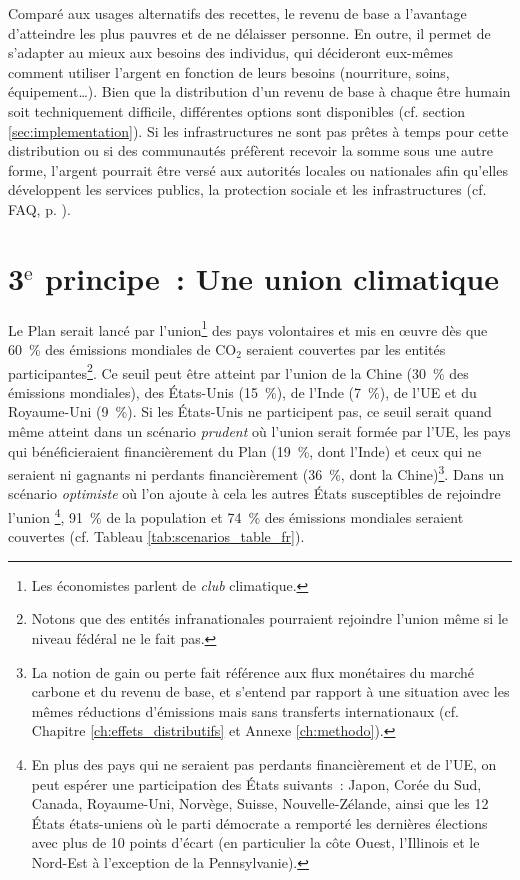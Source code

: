 \documentclass[a5paper,french,openany]{memoir}
\begin{document}
Comparé aux usages alternatifs des recettes, le revenu de base a l'avantage d'atteindre les plus pauvres et de ne délaisser personne. En outre, il permet de s'adapter au mieux aux besoins des individus, qui décideront eux-mêmes comment utiliser l'argent en fonction de leurs besoins (nourriture, soins, équipement\dots{}). 
Bien que la distribution d'un revenu de base à chaque être humain soit techniquement difficile, différentes options sont disponibles %
(cf. section \ref{sec:implementation}). Si les infrastructures ne sont pas prêtes à temps pour cette distribution ou si des communautés préfèrent recevoir la somme sous une autre forme, l'argent pourrait être versé aux autorités locales ou nationales afin qu'elles développent les services publics, la protection sociale et les infrastructures (cf. FAQ, p. \pageref{q:rdb}). 

\section{3$^\text{e}$ principe~: Une union climatique}

Le Plan serait lancé par l'union\footnote{Les économistes parlent de \textit{club} climatique.} des pays volontaires et mis en œuvre dès que 60~\% des émissions mondiales de CO$_\text{2}$ seraient couvertes par les entités participantes\footnote{Notons que des entités infranationales pourraient rejoindre l'union même si le niveau fédéral ne le fait pas.}. Ce seuil peut être atteint par l'union de la Chine (30~\% des émissions mondiales), des États-Unis (15~\%), de l'Inde (7~\%), de l'UE et du Royaume-Uni (9~\%). Si les États-Unis ne participent pas, ce seuil serait quand même atteint dans un scénario \textit{prudent} où l'union serait formée par l'UE, les pays qui bénéficieraient financièrement du Plan (19~\%, dont l'Inde) et ceux qui ne seraient ni gagnants ni perdants financièrement (36~\%, dont la Chine)\footnote{La notion de gain ou perte fait référence aux flux monétaires du marché carbone et du revenu de base, et s'entend par rapport à une situation avec les mêmes réductions d'émissions mais sans transferts internationaux (cf. Chapitre \ref{ch:effets_distributifs} et Annexe \ref{ch:methodo}).}. %
Dans un scénario \textit{optimiste} où l'on ajoute à cela les autres États susceptibles de rejoindre l'union%
\footnote{En plus des pays qui ne seraient pas perdants financièrement et de l'UE, on peut espérer une participation des États suivants~: Japon, Corée du Sud, Canada, Royaume-Uni, Norvège, Suisse, Nouvelle-Zélande, ainsi que les 12 États états-uniens où le parti démocrate a remporté les dernières élections avec plus de 10 points d'écart (en particulier la côte Ouest, l'Illinois et le Nord-Est à l'exception de la Pennsylvanie).}, 
91~\% de la population et 74~\% des émissions mondiales seraient couvertes (cf. Tableau \ref{tab:scenarios_table_fr}). 
\end{document}

